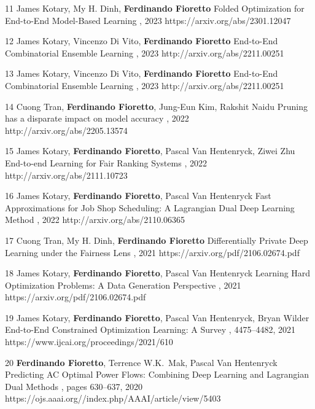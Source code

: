 \documentclass[localFont,alternative]{documentMETADATA}
\begin{document}
\begin{pubs}
\confentryShort 
	{11} %
	{{James Kotary}, {My H. Dinh}, {\bf Ferdinando Fioretto}}
	{Folded Optimization for End-to-End Model-Based Learning}
	{\procIJCAI, 2023}
	{https://arxiv.org/abs/2301.12047}

\confentryShort
  {12} %
	{{James Kotary}, {Vincenzo Di Vito}, {\bf Ferdinando Fioretto}}
	{End-to-End Combinatorial Ensemble Learning}
  {\procIJCAI, 2023}
	{http://arxiv.org/abs/2211.00251}

\confentryShort
  {13} %
	{James Kotary, Vincenzo Di Vito, {\bf Ferdinando Fioretto}}
	{End-to-End Combinatorial Ensemble Learning}
  {\procIJCAI, 2023}
	{http://arxiv.org/abs/2211.00251}
  
\confentryShort
	{14} %
	{{Cuong Tran}, {\bf Ferdinando Fioretto}, Jung-Eun Kim, {Rakshit Naidu}}
	{Pruning has a disparate impact on model accuracy}
	{\procNeurIPS, 2022}
	{http://arxiv.org/abs/2205.13574}
	
\confentryShort
	{15} %
	{{James Kotary}, {\bf Ferdinando Fioretto}, Pascal Van Hentenryck, Ziwei Zhu}
	{End-to-end Learning for Fair Ranking Systems}
	{\procWWW, 2022}
	{http://arxiv.org/abs/2111.10723}	
	
	\confentryShort
	{16} %
	{{James Kotary}, {\bf Ferdinando Fioretto}, Pascal Van Hentenryck}
	{Fast Approximations for Job Shop Scheduling: A Lagrangian Dual Deep Learning Method}
	{\procAAAI, 2022}
	{http://arxiv.org/abs/2110.06365}

	\confentryShort 
	{17} %
	{{Cuong Tran}, {My H. Dinh}, {\bf Ferdinando Fioretto}}
	{Differentially Private Deep Learning under the Fairness Lens}
	{\procNeurIPS, 2021}
	{https://arxiv.org/pdf/2106.02674.pdf}

	\confentryShort 
	{18} %
	{{James Kotary}, {\bf Ferdinando Fioretto}, Pascal Van Hentenryck}
	{Learning Hard Optimization Problems: A Data Generation Perspective}
	{\procNeurIPS, 2021}
	{https://arxiv.org/pdf/2106.02674.pdf}

	\confentryShort 
	{19} %
	{{James Kotary}, {\bf Ferdinando Fioretto}, Pascal Van Hentenryck, Bryan Wilder}
	{End-to-End Constrained Optimization Learning: A Survey}
	{\procIJCAI, 4475--4482, 2021}
	{https://www.ijcai.org/proceedings/2021/610}


	\confentryShort
		{20} %
		{{\bf Ferdinando Fioretto}, Terrence W.K.~Mak, Pascal Van Hentenryck}
		{Predicting AC Optimal Power Flows: Combining Deep Learning and Lagrangian Dual Methods}
  	{\procAAAI, pages 630--637, 2020}
  	{https://ojs.aaai.org//index.php/AAAI/article/view/5403}
\end{pubs}
\end{document}
